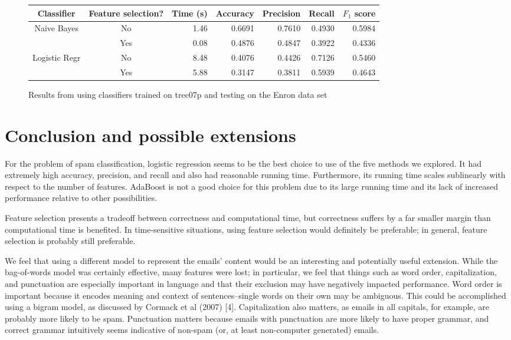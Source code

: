 \documentclass{article} %
\begin{document}
\begin{figure}[h]
  \begin{tabular}[h]{ | c | c | r | r | r | r | r | }
    \hline
    Classifier    & Feature selection? & Time (s) & Accuracy & Precision & Recall & $F_1$ score  \\ \hline
    Naive Bayes   & No                 & 1.46     & 0.6691   & 0.7610    & 0.4930 & 0.5984       \\ \cline{2-7}  
                  & Yes                & 0.08     & 0.4876   & 0.4847    & 0.3922 & 0.4336       \\ \hline
    Logistic Regr & No                 & 8.48     & 0.4076   & 0.4426    & 0.7126 & 0.5460       \\ \cline{2-7}
                  & Yes                & 5.88     & 0.3147   & 0.3811    & 0.5939 & 0.4643       \\ \hline
  \end{tabular}
  \caption{Results from using classifiers trained on trec07p and testing on the Enron data set}
  \label{fig:table_comparison}
\end{figure}

\section{Conclusion and possible extensions}

For the problem of spam classification, logistic regression seems to be the best choice to use of the five methods we explored. It had extremely high accuracy, precision, and recall and also had reasonable running time. Furthermore, its running time scales sublinearly with respect to the number of features. AdaBoost is not a good choice for this problem due to its large running time and its lack of increased performance relative to other possibilities. 

Feature selection presents a tradeoff between correctness and computational time, but correctness suffers by a far smaller margin than computational time is benefited. In time-sensitive situations, using feature selection would definitely be preferable; in general, feature selection is probably still preferable.

We feel that using a different model to represent the emails' content would be an interesting and potentially useful extension. While the bag-of-words model was certainly effective, many features were lost; in particular, we feel that things such as word order, capitalization, and punctuation are especially important in language and that their exclusion may have negatively impacted performance. Word order is important because it encodes meaning and context of sentences--single words on their own may be ambiguous. This could be accomplished using a bigram model, as discussed by Cormack et al (2007) [4]. Capitalization also matters, as emails in all capitals, for example, are probably more likely to be spam. Punctuation matters because emails with punctuation are more likely to have proper grammar, and correct grammar intuitively seems indicative of non-spam (or, at least non-computer generated) emails. 
\end{document}
